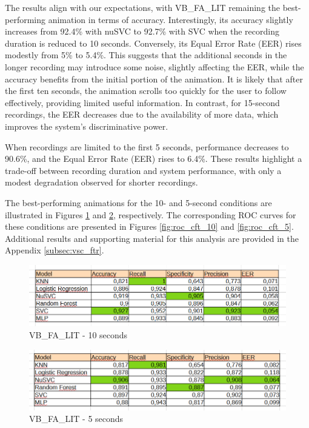 \documentclass{article}
\begin{document}
The results align with our expectations, with VB\_FA\_LIT remaining the best-performing animation in terms of accuracy. 
Interestingly, its accuracy slightly increases from 92.4\% with nuSVC to 92.7\% with SVC when the recording duration is reduced to 10 seconds. 
Conversely, its Equal Error Rate (EER) rises modestly from 5\% to 5.4\%. 
This suggests that the additional seconds in the longer recording may introduce some noise, slightly affecting the EER, while the accuracy benefits from the initial portion of the animation. 
It is likely that after the first ten seconds, the animation scrolls too quickly for the user to follow effectively, providing limited useful information. 
In contrast, for 15-second recordings, the EER decreases due to the availability of more data, which improves the system’s discriminative power.

When recordings are limited to the first 5 seconds, performance decreases to 90.6\%, and the Equal Error Rate (EER) rises to 6.4\%. 
These results highlight a trade-off between recording duration and system performance, with only a modest degradation observed for shorter recordings.

The best-performing animations for the 10- and 5-second conditions are illustrated in Figures \ref{fig:VB_FA_LIT_cft_10} and \ref{fig:VB_FA_LIT_cft_5}, respectively. 
The corresponding ROC curves for these conditions are presented in Figures \ref{fig:roc_cft_10} and \ref{fig:roc_cft_5}.
Additional results and supporting material for this analysis are provided in the Appendix \ref{subsec:vsc_ftr}.

\begin{figure}[ht]
    \centering
    \includegraphics[width = 0.8
    \textwidth]{Images/Results/Classic_procedure/five_ten/ft/ten/VB_FA_LIT.png}
    \caption{VB\_FA\_LIT - 10 seconds}
    \label{fig:VB_FA_LIT_cft_10}
\end{figure}

\begin{figure}[ht]
    \centering
    \includegraphics[width = 0.8
    \textwidth]{Images/Results/Classic_procedure/five_ten/ft/five/VB_FA_LIT.png}
    \caption{VB\_FA\_LIT - 5 seconds}
    \label{fig:VB_FA_LIT_cft_5}
\end{figure}
\end{document}

